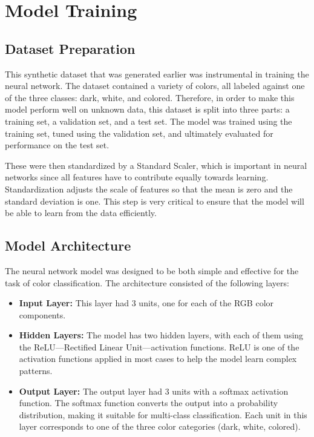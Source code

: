 \documentclass{article}
\begin{document}
\newpage

\section{Model Training}

\subsection{Dataset Preparation}
This synthetic dataset that was generated earlier was instrumental in training the neural network. The dataset contained a variety of colors, all labeled against one of the three classes: dark, white, and colored. Therefore, in order to make this model perform well on unknown data, this dataset is split into three parts: a training set, a validation set, and a test set. The model was trained using the training set, tuned using the validation set, and ultimately evaluated for performance on the test set.

These were then standardized by a Standard Scaler, which is important in neural networks since all features have to contribute equally towards learning. Standardization adjusts the scale of features so that the mean is zero and the standard deviation is one. This step is very critical to ensure that the model will be able to learn from the data efficiently.

\subsection{Model Architecture}
The neural network model was designed to be both simple and effective for the task of color classification. The architecture consisted of the following layers:

\begin{itemize}
    \item \textbf{Input Layer:} This layer had 3 units, one for each of the RGB color components.
    \item \textbf{Hidden Layers:} The model has two hidden layers, with each of them using the ReLU—Rectified Linear Unit—activation functions. ReLU is one of the activation functions applied in most cases to help the model learn complex patterns.
    \item \textbf{Output Layer:} The output layer had 3 units with a softmax activation function. The softmax function converts the output into a probability distribution, making it suitable for multi-class classification. Each unit in this layer corresponds to one of the three color categories (dark, white, colored).
\end{itemize}
\end{document}
